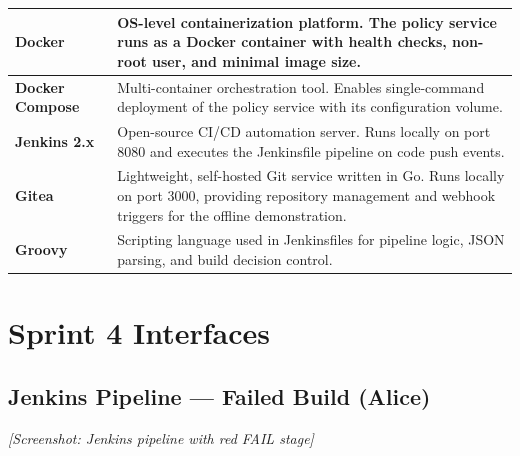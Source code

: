 \vspace{0.5cm}
\begin{tabular}{| m{2.5cm} | m{10cm} |}
\hline

\textbf{Docker}~\cite{docker} &
OS-level containerization platform. The policy service runs as a Docker container with health checks, non-root user, and minimal image size.
\\
\hline

\textbf{Docker Compose}~\cite{dockercompose} &
Multi-container orchestration tool. Enables single-command deployment of the policy service with its configuration volume.
\\
\hline

\textbf{Jenkins 2.x}~\cite{jenkins} &
Open-source CI/CD automation server. Runs locally on port 8080 and executes the Jenkinsfile pipeline on code push events.
\\
\hline

\textbf{Gitea} &
Lightweight, self-hosted Git service written in Go. Runs locally on port 3000, providing repository management and webhook triggers for the offline demonstration.
\\
\hline

\textbf{Groovy} &
Scripting language used in Jenkinsfiles for pipeline logic, JSON parsing, and build decision control.
\\
\hline

\end{tabular}

\section{Sprint 4 Interfaces}

\subsection{Jenkins Pipeline — Failed Build (Alice)}


\textit{[Screenshot: Jenkins pipeline with red FAIL stage]}

